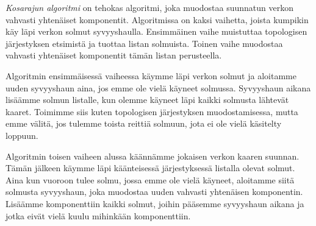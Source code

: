 
\emph{Kosarajun algoritmi} on tehokas algoritmi,
joka muodostaa suunnatun verkon vahvasti yhtenäiset
komponentit. Algoritmissa on kaksi vaihetta,
joista kumpikin käy läpi verkon solmut syvyyshaulla.
Ensimmäinen vaihe muistuttaa topologisen järjestyksen
etsimistä ja tuottaa listan solmuista.
Toinen vaihe muodostaa vahvasti yhtenäiset komponentit
tämän listan perusteella.

Algoritmin ensimmäisessä vaiheessa käymme läpi verkon
solmut ja aloitamme uuden syvyyshaun aina,
jos emme ole vielä käyneet solmussa.
Syvyyshaun aikana lisäämme solmun listalle,
kun olemme käyneet läpi kaikki solmusta lähtevät kaaret.
Toimimme siis kuten topologisen järjestyksen muodostamisessa,
mutta emme välitä, jos tulemme toista reittiä solmuun,
jota ei ole vielä käsitelty loppuun.

Algoritmin toisen vaiheen alussa
käännämme jokaisen verkon kaaren suunnan.
Tämän jälkeen käymme läpi käänteisessä järjestyksessä
listalla olevat solmut.
Aina kun vuoroon tulee solmu, jossa emme ole vielä käyneet,
aloitamme siitä solmusta syvyyshaun,
joka muodostaa uuden vahvasti yhtenäisen komponentin.
Lisäämme komponenttiin kaikki solmut,
joihin pääsemme syvyyshaun aikana ja jotka eivät
vielä kuulu mihinkään komponenttiin.

